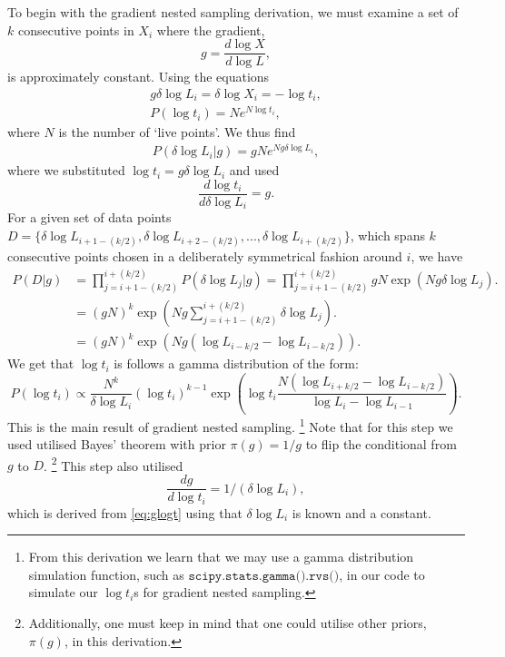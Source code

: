 To begin with the gradient nested sampling derivation, we must examine a set of $k$ consecutive points in ${X_i}$ where the gradient,
\begin{equation}
g= \frac{d \log X}{d \log L},
\label{eq:ggg}
\end{equation}
%
is approximately constant. Using the equations 
%
\begin{align}
g \delta \log L_{i} = \delta \log X_i= -\log t_i, \\
P(\log t_{i})=Ne^{N \log t_i},
\label{eq:glogt}
\end{align}
%
where $N$ is the number of `live points'. We thus find
%
\begin{align}
P(\delta \log L_i|g)= gNe^{Ng \delta \log L_i},
\end{align}
%
where we substituted  $\log t_i= g\delta \log L_i$ and used 
\begin{equation}
    \frac{d \log t_i}{d\delta \log L_i}= g.
\end{equation}
For a given set of data points $D= \{ \delta \log L_{i+1-(k/2)},\delta \log L_{i+2-(k/2)},...,\delta \log L_{i+(k/2)} \}$, which spans $k$ consecutive points chosen in a deliberately symmetrical fashion around $i$, we have
%
\begin{align}
P(D|g)&= \prod_{j=i+1-(k/2)}^{i+(k/2)} P(\delta \log L_j|g) = \prod_{j=i+1-(k/2)}^{i+(k/2)} gN \exp (Ng \delta \log L_j).\\
&=  (gN)^k\exp\left(Ng \sum_{j=i+1-(k/2)}^{i+(k/2)}\delta \log L_j\right).\\
&=  (gN)^k\exp\left(Ng (\log L_{i-k/2} - \log L_{i-k/2})\right).
\end{align}
%
We get that $\log t_i$ is follows a gamma distribution \cite{hogg_craig_1971} of the form:
%
\begin{equation}
P(\log t_i) \propto \frac{N^k}{\delta \log L_i}(\log t_i)^{k-1} \exp \left( \log t_i \frac{N(\log L_{i+k/2}-\log L_{i-k/2})}{\log L_i-\log L_{i-1}} \right).
\label{eq:blab}
\end{equation}
%
This is the main result of gradient nested sampling. \footnote{From this derivation we learn that we may use a gamma distribution simulation function, such as $\texttt{scipy.stats.gamma().rvs()}$, in our code to simulate our $\log t_i$s for gradient nested sampling.} Note that for this step we used utilised Bayes' theorem with prior $\pi (g)=1/g$ to flip the conditional from $g$ to $D$. \footnote{Additionally, one must keep in mind that one could utilise other priors, $\pi(g)$, in this derivation.} This step also utilised
%
\begin{equation}
  \frac{dg}{d\log t_i}  = 1/(\delta \log L_{i}),
\end{equation}
%
which is derived from \cref{eq:glogt} using that $\delta \log L_{i}$ is known and a constant. 

